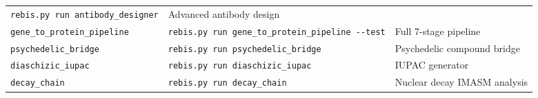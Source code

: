 \begin{longtable}[]{@{}lll@{}}
\begin{minipage}[t]{0.27\columnwidth}
\texttt{rebis.py\ run\ antibody\_designer}\strut
\end{minipage} & \begin{minipage}[t]{0.40\columnwidth}\raggedright
Advanced antibody design\strut
\end{minipage}\tabularnewline
\begin{minipage}[t]{0.24\columnwidth}\raggedright
\texttt{gene\_to\_protein\_pipeline}\strut
\end{minipage} & \begin{minipage}[t]{0.27\columnwidth}\raggedright
\texttt{rebis.py\ run\ gene\_to\_protein\_pipeline\ -\/-test}\strut
\end{minipage} & \begin{minipage}[t]{0.40\columnwidth}\raggedright
Full 7-stage pipeline\strut
\end{minipage}\tabularnewline
\begin{minipage}[t]{0.24\columnwidth}\raggedright
\texttt{psychedelic\_bridge}\strut
\end{minipage} & \begin{minipage}[t]{0.27\columnwidth}\raggedright
\texttt{rebis.py\ run\ psychedelic\_bridge}\strut
\end{minipage} & \begin{minipage}[t]{0.40\columnwidth}\raggedright
Psychedelic compound bridge\strut
\end{minipage}\tabularnewline
\begin{minipage}[t]{0.24\columnwidth}\raggedright
\texttt{diaschizic\_iupac}\strut
\end{minipage} & \begin{minipage}[t]{0.27\columnwidth}\raggedright
\texttt{rebis.py\ run\ diaschizic\_iupac}\strut
\end{minipage} & \begin{minipage}[t]{0.40\columnwidth}\raggedright
IUPAC generator\strut
\end{minipage}\tabularnewline
\begin{minipage}[t]{0.24\columnwidth}\raggedright
\texttt{decay\_chain}\strut
\end{minipage} & \begin{minipage}[t]{0.27\columnwidth}\raggedright
\texttt{rebis.py\ run\ decay\_chain}\strut
\end{minipage} & \begin{minipage}[t]{0.40\columnwidth}\raggedright
Nuclear decay IMASM analysis\strut
\end{minipage}\tabularnewline
\bottomrule
\end{longtable}

